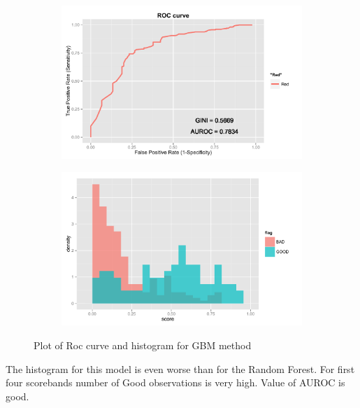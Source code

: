 \documentclass[10pt]{article}\usepackage[]{graphicx}\usepackage[]{color}
\begin{document}
\begin{figure}[h!]
        \centering
        \begin{subfigure}[b]{0.45\textwidth}
                \includegraphics[width=\textwidth]{Plots/ROC_GBM}
                \caption{}
                \label{fig:ROC_ GBM}
        \end{subfigure}
        \begin{subfigure}[b]{0.45\textwidth}
                \includegraphics[width=\textwidth]{Plots/HIST_GBM}
                \label{fig:HIST_ GBM}
        \end{subfigure}

        \caption{Plot of Roc curve and histogram for GBM method}\label{fig:GBM}
\end{figure}


The histogram for this model is even worse than for the Random Forest. For first four scorebands number of Good observations is very high.  Value of AUROC is good.
\end{document}
